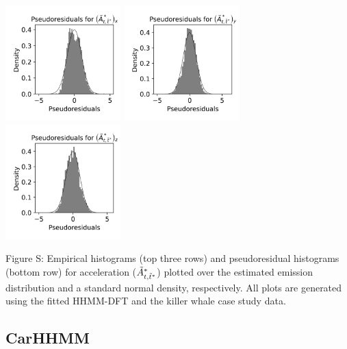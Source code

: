 \documentclass{article}
\begin{document}
\begin{center}
        \includegraphics[width=1.75in]{../Plots/2019/20190902-182840-CATs_OB_1_0_267_HHMM_pseudresids_Ax.png}
        \includegraphics[width=1.75in]{../Plots/2019/20190902-182840-CATs_OB_1_0_267_HHMM_pseudresids_Ay.png}
        \includegraphics[width=1.75in]{../Plots/2019/20190902-182840-CATs_OB_1_0_267_HHMM_pseudresids_Az.png}
        \end{center}
        
        \noindent Figure S: Empirical histograms (top three rows) and pseudoresidual histograms (bottom row) for acceleration ($\tilde{A}^*_{t,\tilde t^*}$) plotted over the estimated emission distribution and a standard normal density, respectively. All plots are generated using the fitted HHMM-DFT and the killer whale case study data.
        \addtocounter{fignum}{1}
        
        \newpage
        
        \subsection{CarHHMM}
        
\end{document}
